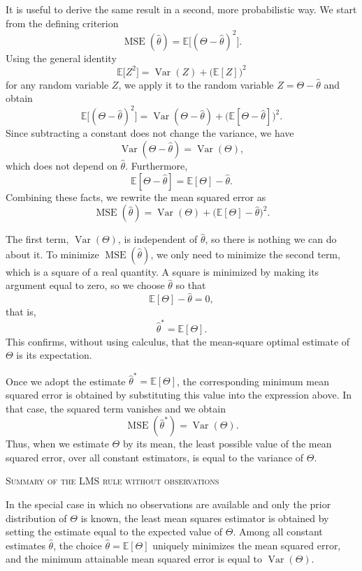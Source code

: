 It is useful to derive the same result in a second, more probabilistic way.  
We start from the defining criterion
\[
\operatorname{MSE}(\hat{\theta})
=
\mathbb{E}\big[(\Theta - \hat{\theta})^{2}\big].
\]
Using the general identity
\[
\mathbb{E}\big[Z^{2}\big]
=
\operatorname{Var}(Z)
+
\big(\mathbb{E}[Z]\big)^{2}
\]
for any random variable \(Z\), we apply it to the random variable \(Z = \Theta - \hat{\theta}\) and obtain
\[
\mathbb{E}\big[(\Theta - \hat{\theta})^{2}\big]
=
\operatorname{Var}(\Theta - \hat{\theta})
+
\big(\mathbb{E}[\Theta - \hat{\theta}]\big)^{2}.
\]
Since subtracting a constant does not change the variance, we have
\[
\operatorname{Var}(\Theta - \hat{\theta})
=
\operatorname{Var}(\Theta),
\]
which does not depend on \(\hat{\theta}\).  
Furthermore,
\[
\mathbb{E}[\Theta - \hat{\theta}]
=
\mathbb{E}[\Theta] - \hat{\theta}.
\]
Combining these facts, we rewrite the mean squared error as
\[
\operatorname{MSE}(\hat{\theta})
=
\operatorname{Var}(\Theta)
+
\big(\mathbb{E}[\Theta] - \hat{\theta}\big)^{2}.
\]

The first term, \(\operatorname{Var}(\Theta)\), is independent of \(\hat{\theta}\), so there is nothing we can do about it.  
To minimize \(\operatorname{MSE}(\hat{\theta})\), we only need to minimize the second term, which is a square of a real quantity.  
A square is minimized by making its argument equal to zero, so we choose \(\hat{\theta}\) so that
\[
\mathbb{E}[\Theta] - \hat{\theta} = 0,
\]
that is,
\[
\hat{\theta}^{\ast}
=
\mathbb{E}[\Theta].
\]
This confirms, without using calculus, that the mean-square optimal estimate of \(\Theta\) is its expectation.

Once we adopt the estimate \(\hat{\theta}^{\ast} = \mathbb{E}[\Theta]\), the corresponding minimum mean squared error is obtained by substituting this value into the expression above.  
In that case, the squared term vanishes and we obtain
\[
\operatorname{MSE}(\hat{\theta}^{\ast})
=
\operatorname{Var}(\Theta).
\]
Thus, when we estimate \(\Theta\) by its mean, the least possible value of the mean squared error, over all constant estimators, is equal to the variance of \(\Theta\).

\bigskip
\textsc{Summary of the LMS rule without observations}

In the special case in which no observations are available and only the prior distribution of \(\Theta\) is known, the least mean squares estimator is obtained by setting the estimate equal to the expected value of \(\Theta\).  
Among all constant estimates \(\hat{\theta}\), the choice \(\hat{\theta} = \mathbb{E}[\Theta]\) uniquely minimizes the mean squared error, and the minimum attainable mean squared error is equal to \(\operatorname{Var}(\Theta)\).


